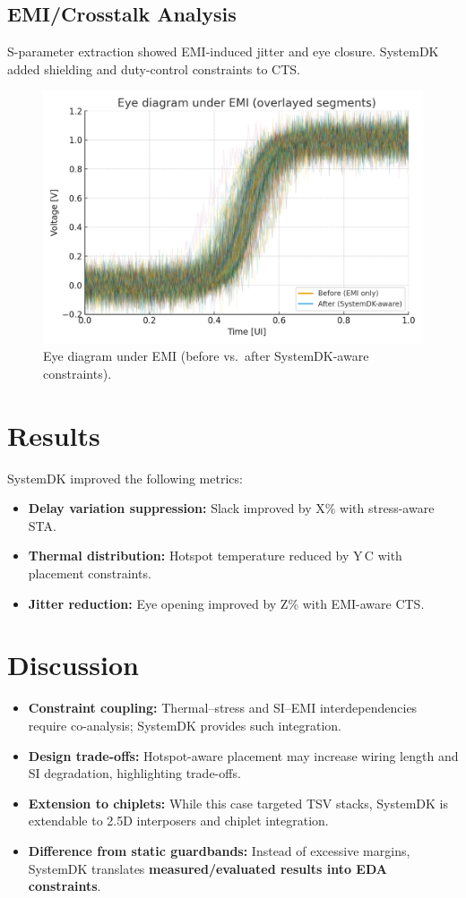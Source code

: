 \documentclass[conference]{IEEEtran}
\begin{document}
\subsection{EMI/Crosstalk Analysis}
S-parameter extraction showed EMI-induced jitter and eye closure.
SystemDK added shielding and duty-control constraints to CTS.

\begin{figure}[htbp]
  \centering
  \includegraphics[width=0.8\linewidth]{eye_diagram}
  \caption{Eye diagram under EMI (before vs.\ after SystemDK-aware constraints).}
  \label{fig:eye}
\end{figure}

\section{Results}
SystemDK improved the following metrics:
\begin{itemize}
  \item \textbf{Delay variation suppression:} Slack improved by X\% with stress-aware STA.
  \item \textbf{Thermal distribution:} Hotspot temperature reduced by Y\,\textdegree C with placement constraints.
  \item \textbf{Jitter reduction:} Eye opening improved by Z\% with EMI-aware CTS.
\end{itemize}

\section{Discussion}
\begin{itemize}
  \item \textbf{Constraint coupling:} Thermal--stress and SI--EMI interdependencies require co-analysis; SystemDK provides such integration.
  \item \textbf{Design trade-offs:} Hotspot-aware placement may increase wiring length and SI degradation, highlighting trade-offs.
  \item \textbf{Extension to chiplets:} While this case targeted TSV stacks, SystemDK is extendable to 2.5D interposers and chiplet integration.
  \item \textbf{Difference from static guardbands:} Instead of excessive margins, SystemDK translates \textbf{measured/evaluated results into EDA constraints}.
\end{itemize}
\end{document}
